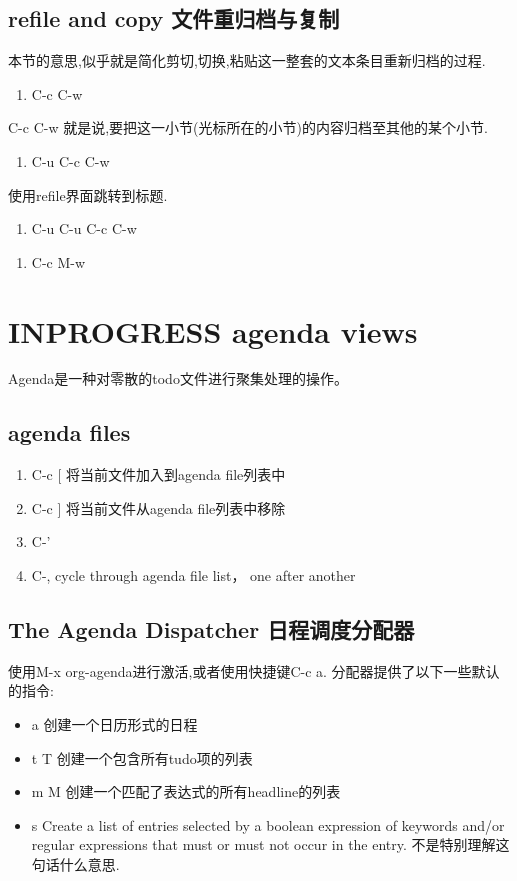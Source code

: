 \documentclass[10pt,a4paper]{article}
\begin{document}
\subsection{refile and copy 文件重归档与复制}
\label{sec:org74de062}
本节的意思,似乎就是简化剪切,切换,粘贴这一整套的文本条目重新归档的过程.
\begin{enumerate}
\item C-c C-w
\end{enumerate}
C-c C-w 就是说,要把这一小节(光标所在的小节)的内容归档至其他的某个小节.

\begin{enumerate}
\item C-u C-c C-w
\end{enumerate}
使用refile界面跳转到标题.

\begin{enumerate}
\item C-u C-u C-c C-w
\end{enumerate}


\begin{enumerate}
\item C-c M-w
\end{enumerate}

\section{{\bfseries\sffamily INPROGRESS} agenda views}
\label{sec:org169a202}
Agenda是一种对零散的todo文件进行聚集处理的操作。

\subsection{agenda files}
\label{sec:org48cdc80}
\begin{enumerate}
\item C-c [ 将当前文件加入到agenda file列表中
\item C-c ] 将当前文件从agenda file列表中移除
\item C-'
\item C-, cycle through agenda file list， one after another
\end{enumerate}

\subsection{The Agenda Dispatcher 日程调度分配器}
\label{sec:org75b2417}
使用M-x org-agenda进行激活,或者使用快捷键C-c a.
分配器提供了以下一些默认的指令:
\begin{itemize}
\item a 创建一个日历形式的日程
\item t T 创建一个包含所有tudo项的列表
\item m M 创建一个匹配了表达式的所有headline的列表
\item s Create a list of entries selected by a boolean expression of keywords and/or regular expressions that must or must not occur in the entry. 不是特别理解这句话什么意思.
\end{itemize}
\end{document}
